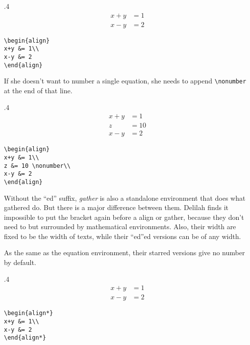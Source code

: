 \begin{miniexammar}{.4\textandmarginlen}{
\begin{align}
x+y &= 1\\
x-y &= 2
\end{align}
}
\begin{lstlisting}
\begin{align}
x+y &= 1\\
x-y &= 2
\end{align}
\end{lstlisting}
\end{miniexammar}

If she doesn't want to number a single equation, she needs to append \verb=\nonumber= at the end of that line.
\begin{miniexammar}{.4\textandmarginlen}{
\begin{align}
x+y &= 1\\
z&=10 \nonumber\\
x-y &= 2
\end{align}
}
\begin{lstlisting}
\begin{align}
x+y &= 1\\
z &= 10 \nonumber\\
x-y &= 2
\end{align}
\end{lstlisting}
\end{miniexammar}

Without the ``ed'' suffix, \emph{gather} is also a standalone environment that does what gathered do. But there is a major difference between them. Delilah finds it impossible to put the bracket again before a align or gather, because they don't need to but surrounded by mathematical environments. Also, their width are fixed to be the width of texts, while their ``ed''ed versions can be of any width.

As the same as the equation environment, their starred versions give no number by default.
\begin{miniexammar}{.4\textandmarginlen}{
\begin{align*}
x+y &= 1\\
x-y &= 2
\end{align*}
}
\begin{lstlisting}
\begin{align*}
x+y &= 1\\
x-y &= 2
\end{align*}
\end{lstlisting}
\end{miniexammar}

